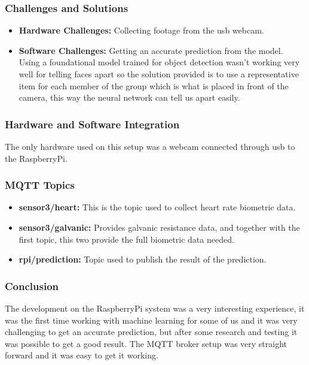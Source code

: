 \subsubsection{Challenges and Solutions}
\begin{itemize}
    \item \textbf{Hardware Challenges:} Collecting footage from the usb webcam.
    \item \textbf{Software Challenges:} Getting an accurate prediction from the model. Using a foundational model trained for object detection wasn't working very well for telling faces apart so the solution provided is to use a representative item for each member of the group which is what is placed in front of the camera, this way the neural network can tell us apart easily.
\end{itemize}

\subsubsection{Hardware and Software Integration}
The only hardware used on this setup was a webcam connected through usb to the RaspberryPi.

\subsubsection{MQTT Topics}
\begin{itemize}
    \item \textbf{sensor3/heart:} This is the topic used to collect heart rate biometric data.
    \item \textbf{sensor3/galvanic:} Provides galvanic resistance data, and together with the first topic, this two provide the full biometric data needed.
    \item \textbf{rpi/prediction:} Topic used to publish the result of the prediction.
\end{itemize}

\subsubsection{Conclusion}
The development on the RaspberryPi system was a very interesting experience, it was the first time working with machine learning for some of us and it was very challenging to get an accurate prediction, but after some research and testing it was possible to get a good result. The MQTT broker setup was very straight forward and it was easy to get it working.